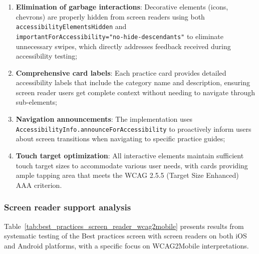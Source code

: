 \begin{enumerate}
    \item \textbf{Elimination of garbage interactions}: Decorative elements (icons, chevrons) are properly hidden from screen readers using both \texttt{accessibilityElementsHidden} and \\ \texttt{importantForAccessibility="no-hide-descendants"} to eliminate unnecessary swipes, which directly addresses feedback received during accessibility testing;
    
    \item \textbf{Comprehensive card labels}: Each practice card provides detailed accessibility labels that include the category name and description, ensuring screen reader users get complete context without needing to navigate through sub-elements;
    
    \item \textbf{Navigation announcements}: The implementation uses \\ \texttt{AccessibilityInfo.announceForAccessibility} to proactively inform users about screen transitions when navigating to specific practice guides;
    
    \item \textbf{Touch target optimization}: All interactive elements maintain sufficient touch target sizes to accommodate various user needs, with cards providing ample tapping area that meets the WCAG 2.5.5 (Target Size Enhanced) AAA criterion.
\end{enumerate}

\subsubsection{Screen reader support analysis}

Table~\ref{tab:best_practices_screen_reader_wcag2mobile} presents results from systematic testing of the Best practices screen with screen readers on both iOS and Android platforms, with a specific focus on WCAG2Mobile interpretations.

